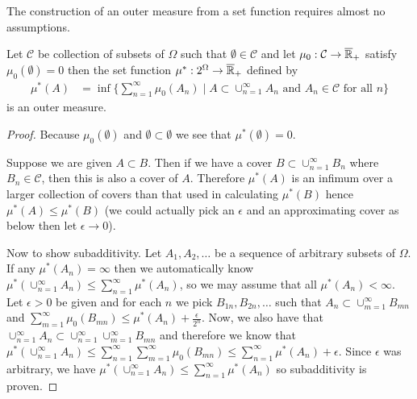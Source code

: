 The construction of an outer measure from a set function requires almost no assumptions.
\begin{lem}\label{PremeasureToOuterMeasure}Let $\mathcal{C}$ be collection of subsets of $\Omega$ such that $\emptyset \in \mathcal{C}$ and
let $\mu_0 : \mathcal{C} \to \overline{\mathbb{R}}_+$ satisfy $\mu_0(\emptyset) = 0$  then the set function $\mu^* : 2^\Omega \to
  \overline{\mathbb{R}}_+$ defined by
\begin{align*}
\mu^*(A) &= \inf \lbrace \sum_{n=1}^\infty \mu_0(A_n) \mid A \subset
\cup_{n=1}^\infty A_n \text { and } A_n \in \mathcal{C} \text{ for
  all $n$} \rbrace
\end{align*}
is an outer measure.
\end{lem}
\begin{proof}
Because $\mu_0(\emptyset)$ and $\emptyset \subset \emptyset$ we see
that $\mu^*(\emptyset) = 0$.

Suppose we are given $A \subset B$.  Then if we have a cover $B
\subset \cup_{n=1}^\infty B_n$ where $B_n \in \mathcal{C}$, then
this is also a cover of $A$.  Therefore $\mu^*(A)$ is an infimum over
a larger collection of covers than that used in calculating $\mu^*(B)$
hence $\mu^*(A) \leq \mu^*(B)$ (we could actually pick an $\epsilon$
and an approximating cover as below then let $\epsilon \to 0$).

Now to show subadditivity.  Let $A_1, A_2, \dotsc$ be a sequence of
arbitrary subsets of $\Omega$.  If any $\mu^*(A_n) = \infty$ then we
automatically know $\mu^*(\cup_{n=1}^\infty A_n) \leq \sum_{n=1}^\infty \mu^*(A_n)$, so we
may assume that all $\mu^*(A_n) < \infty$.  Let $\epsilon > 0$ be
given and for each $n$ we pick $B_{1n}, B_{2n}, \dotsc$ such that $A_n
\subset \cup_{m=1}^\infty B_{mn}$ and $\sum_{m=1}^\infty \mu_0(B_{mn})
\leq \mu^*(A_n) + \frac{\epsilon}{2^n}$.  Now, we also have that
$\cup_{n=1}^\infty A_n
\subset  \cup_{n=1}^\infty \cup_{m=1}^\infty B_{mn}$ and therefore we
know that $\mu^*(\cup_{n=1}^\infty A_n) \leq \sum_{n=1}^\infty \sum_{m=1}^\infty
\mu_0(B_{mn}) \leq \sum_{n=1}^\infty \mu^*(A_n) + \epsilon$.  Since
$\epsilon$ was arbitrary, we have $\mu^*(\cup_{n=1}^\infty A_n) \leq \sum_{n=1}^\infty
\mu^*(A_n)$ so subadditivity is proven.
\end{proof}

